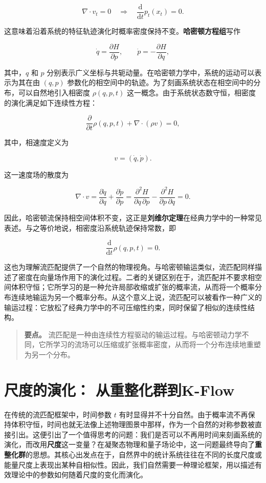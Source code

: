 \[
\nabla \cdot v_t = 0
\quad \Longrightarrow \quad
\frac{\mathrm{d}}{\mathrm{d}t} p_t(x_t)=0.
\]

这意味着沿着系统的特征轨迹演化时概率密度保持不变。\textbf{哈密顿方程组}写作

\[
\dot q = \frac{\partial H}{\partial p},
\qquad
\dot p = -\frac{\partial H}{\partial q},
\]

其中，\(q\) 和 \(p\) 分别表示广义坐标与共轭动量。在哈密顿力学中，系统的运动可以表示为其在由 \((q,p)\) 参数化的相空间中的轨迹。为了刻画系统状态在相空间中的分布，可以自然地引入相密度 \(\rho(q,p,t)\) 这一概念。由于系统状态数守恒，相密度的演化满足如下连续性方程：

\[
\frac{\partial}{\partial t}\rho(q, p, t) + \nabla \cdot (\rho v) = 0,
\]

其中，相速度定义为

\[
v = (\dot q, \dot p).
\]

这一速度场的散度为

\[
\nabla \cdot v
= \frac{\partial \dot q}{\partial q} + \frac{\partial \dot p}{\partial p}
= \frac{\partial^2 H}{\partial q\, \partial p} - \frac{\partial^2 H}{\partial p\, \partial q}
= 0.
\]

因此，哈密顿流保持相空间体积不变，这正是\textbf{刘维尔定理}在经典力学中的一种常见表述。与之等价地说，相密度沿系统轨迹保持常数，即

\[
\frac{\mathrm{d}}{\mathrm{d}t}\rho(q, p, t) = 0.
\]

这也为理解流匹配提供了一个自然的物理视角。与哈密顿输运类似，流匹配同样描述了密度在向量场作用下的演化过程。二者的关键区别在于，流匹配并不要求相空间体积守恒；它所学习的是一种允许局部收缩或扩张的概率流，从而将一个概率分布连续地输运为另一个概率分布。从这个意义上说，流匹配可以被看作一种广义的输运过程：它放松了经典力学中的不可压缩性约束，同时保留了相似的连续性结构。

\begin{quote}
\textbf{要点。} 流匹配是一种由连续性方程驱动的输运过程。与哈密顿动力学不同，它所学习的流场可以压缩或扩张概率密度，从而将一个分布连续地重塑为另一个分布。
\end{quote}

\section{尺度的演化： 从重整化群到K-Flow}

在传统的流匹配框架中，时间参数 \(t\) 有时显得并不十分自然。由于概率流不再保持体积守恒，时间也就无法像上述物理图景中那样，作为一个自然的对称参数被直接引出。这便引出了一个值得思考的问题：我们是否可以不再用时间来刻画系统的演化，而改用\textbf{尺度}这一变量？在凝聚态物理和量子场论中，这一问题最终导向了\textbf{重整化群}的思想。其核心出发点在于，自然界中的统计系统往往在不同的长度尺度或能量尺度上表现出某种自相似性。因此，我们自然需要一种理论框架，用以描述有效理论中的参数如何随着尺度的变化而演化。

